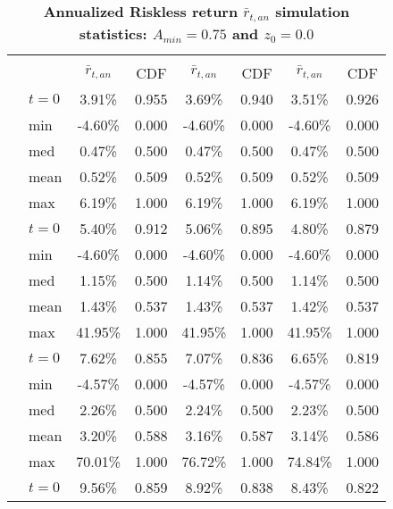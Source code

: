 \documentclass[letterpaper,12pt]{article}
\theoremstyle{definition}
\begin{document}
\begin{spacing}{1.5}
  \begin{table}[htbp]\centering\captionsetup{width=4.6in}
  \caption{\label{TabRiskl_A75}\textbf{Annualized Riskless return $\bar{r}_{t,an}$ simulation statistics: $A_{min}=0.75$ and $z_0=0.0$}}
    \begin{threeparttable}
    \begin{tabular}{>{\small}c >{\small}l| >{\small}c >{\small}c| >{\small}c >{\small}c| >{\small}c >{\small}c}
      \hline\hline
      & & \multicolumn{2}{c}{$k_{2,0}=0.11$} & \multicolumn{2}{c}{$k_{2,0}=0.14$} & \multicolumn{2}{c}{$k_{2,0}=0.17$} \\ \cline{3-8}
      & & $\bar{r}_{t,an}$ & CDF & $\bar{r}_{t,an}$ & CDF & $\bar{r}_{t,an}$ & CDF \\
      \hline
      \multirow{5}{*}{$\bar{H}=0.00$}
      & $t=0$ & 3.91\% & 0.955 & 3.69\% & 0.940 & 3.51\% & 0.926 \\
      & min & -4.60\% & 0.000 & -4.60\% & 0.000 & -4.60\% & 0.000 \\
      & med & 0.47\% & 0.500 & 0.47\% & 0.500 & 0.47\% & 0.500 \\
      & mean & 0.52\% & 0.509 & 0.52\% & 0.509 & 0.52\% & 0.509 \\
      & max & 6.19\% & 1.000 & 6.19\% & 1.000 & 6.19\% & 1.000 \\
      \hline
      \multirow{5}{*}{$\bar{H}=0.05$}
      & $t=0$ & 5.40\% & 0.912 & 5.06\% & 0.895 & 4.80\% & 0.879 \\
      & min & -4.60\% & 0.000 & -4.60\% & 0.000 & -4.60\% & 0.000 \\
      & med & 1.15\% & 0.500 & 1.14\% & 0.500 & 1.14\% & 0.500 \\
      & mean & 1.43\% & 0.537 & 1.43\% & 0.537 & 1.42\% & 0.537 \\
      & max & 41.95\% & 1.000 & 41.95\% & 1.000 & 41.95\% & 1.000 \\
      \hline
      \multirow{5}{*}{$\bar{H}=0.11$}
      & $t=0$ & 7.62\% & 0.855 & 7.07\% & 0.836 & 6.65\% & 0.819 \\
      & min & -4.57\% & 0.000 & -4.57\% & 0.000 & -4.57\% & 0.000 \\
      & med & 2.26\% & 0.500 & 2.24\% & 0.500 & 2.23\% & 0.500 \\
      & mean & 3.20\% & 0.588 & 3.16\% & 0.587 & 3.14\% & 0.586 \\
      & max & 70.01\% & 1.000 & 76.72\% & 1.000 & 74.84\% & 1.000 \\
      \hline
      \multirow{5}{*}{$\bar{H}=0.17$}
      & $t=0$ & 9.56\% & 0.859 & 8.92\% & 0.838 & 8.43\% & 0.822 \\

\end{tabular}
\end{threeparttable}
\end{table}
\end{spacing}
\end{document}
